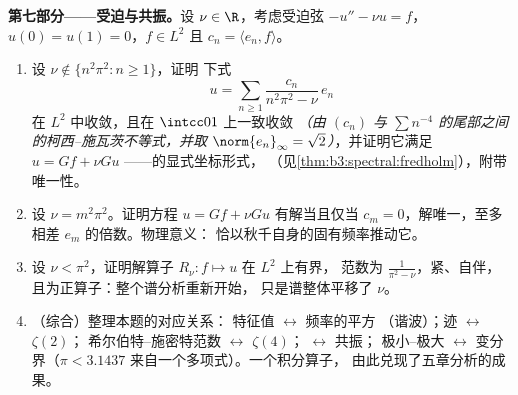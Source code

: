 \begin{problem}
\medskip
\noindent\textbf{第七部分——受迫与共振。}设
$\nu \in \R$，考虑受迫弦 $-u'' - \nu u =
f$，$u(0) = u(1) = 0$，$f \in L^2$ 且 $c_n = \langle
e_n, f\rangle$。
\begin{enumerate}[resume]
  \item 设 $\nu \notin \{n^2\pi^2 : n \geq 1\}$，证明
        下式
        \[
        u = \sum_{n\geq1}\frac{c_n}{n^2\pi^2 - \nu}\,e_n
        \]
        在 $L^2$ 中收敛，且在 $\intcc01$ 上一致收敛
        \emph{（由 $(c_n)$ 与
        $\sum n^{-4}$ 的尾部之间的柯西–施瓦茨不等式，并取 $\norm{e_n}_\infty =
        \sqrt2$）}，并证明它满足 $u = Gf + \nu Gu$
——的显式坐标形式，
        （见\cref{thm:b3:spectral:fredholm}），附带
        唯一性。
  \item 设 $\nu = m^2\pi^2$。证明方程 $u = Gf + \nu
        Gu$ 有解当且仅当 $c_m = 0$，解唯一，至多相差
        $e_m$ 的倍数。物理意义：
        恰以秋千自身的固有频率推动它。
  \item 设 $\nu < \pi^2$，证明解算子
        $R_\nu\colon f \mapsto u$ 在 $L^2$ 上有界，
        范数为 $\frac1{\pi^2 - \nu}$，紧、自伴，
        且为正算子：整个谱分析重新开始，
        只是谱整体平移了 $\nu$。
  \item （综合）整理本题的对应关系：
        特征值 $\leftrightarrow$ 频率的平方
        （谐波）；迹 $\leftrightarrow$ $\zeta(2)$；
        希尔伯特–施密特范数 $\leftrightarrow$ $\zeta(4)$；
         $\leftrightarrow$ 共振；
        极小–极大 $\leftrightarrow$ 变分界（$\pi <
        3.1437$ 来自一个多项式）。一个积分算子，
        由此兑现了五章分析的成果。
\end{enumerate}


\end{problem}
